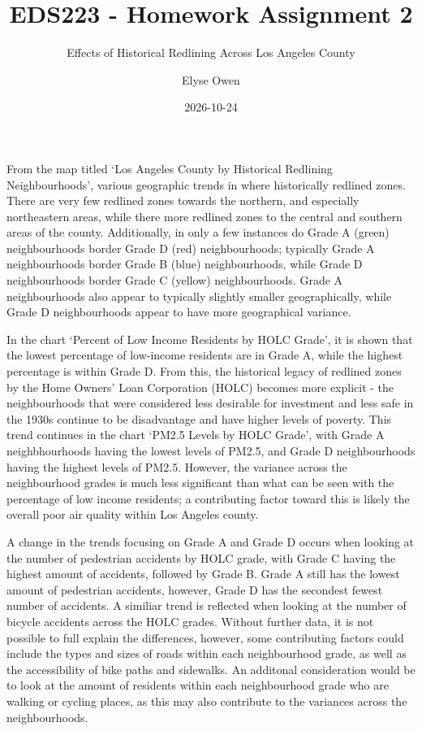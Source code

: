 \documentclass[
  letterpaper,
  DIV=11,
  numbers=noendperiod]{scrartcl}
\title{EDS223 - Homework Assignment 2}
\subtitle{Effects of Historical Redlining Across Los Angeles County}
\author{Elyse Owen}
\date{2026-10-24}
\renewcommand*\contentsname{Table of contents}
\newcommand\contentsname{Table of contents}
\begin{document}
\maketitle

\renewcommand*\contentsname{Table of contents}
{
\setcounter{tocdepth}{3}
\tableofcontents
}

From the map titled `Los Angeles County by Historical Redlining
Neighbourhoods', various geographic trends in where historically
redlined zones. There are very few redlined zones towards the northern,
and especially northeastern areas, while there more redlined zones to
the central and southern areas of the county. Additionally, in only a
few instances do Grade A (green) neighbourhoods border Grade D (red)
neighbourhoods; typically Grade A neighbourhoods border Grade B (blue)
neighbourhoods, while Grade D neighbourhoods border Grade C (yellow)
neighbourhoods. Grade A neighbourhoods also appear to typically slightly
smaller geographically, while Grade D neighbourhoods appear to have more
geographical variance.

In the chart `Percent of Low Income Residents by HOLC Grade', it is
shown that the lowest percentage of low-income residents are in Grade A,
while the highest percentage is within Grade D. From this, the
historical legacy of redlined zones by the Home Owners' Loan Corporation
(HOLC) becomes more explicit - the neighbourhoods that were considered
less desirable for investment and less safe in the 1930s continue to be
disadvantage and have higher levels of poverty. This trend continues in
the chart `PM2.5 Levels by HOLC Grade', with Grade A neighbhourhoods
having the lowest levels of PM2.5, and Grade D neighbourhoods having the
highest levels of PM2.5. However, the variance across the neighbourhood
grades is much less significant than what can be seen with the
percentage of low income residents; a contributing factor toward this is
likely the overall poor air quality within Los Angeles county.

A change in the trends focusing on Grade A and Grade D occurs when
looking at the number of pedestrian accidents by HOLC grade, with Grade
C having the highest amount of accidents, followed by Grade B. Grade A
still has the lowest amount of pedestrian accidents, however, Grade D
has the secondest fewest number of accidents. A similiar trend is
reflected when looking at the number of bicycle accidents across the
HOLC grades. Without further data, it is not possible to full explain
the differences, however, some contributing factors could include the
types and sizes of roads within each neighbourhood grade, as well as the
accessibility of bike paths and sidewalks. An additonal consideration
would be to look at the amount of residents within each neighbourhood
grade who are walking or cycling places, as this may also contribute to
the variances across the neighbourhoods.
\end{document}
